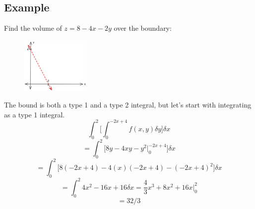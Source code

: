 \documentclass{article}
\begin{document}
\subsection{Example}
Find the volume of $z = 8 - 4x - 2y$ over the boundary: 
\begin{figure}[H]
    \centering
    \includegraphics[width=0.3\textwidth]{figures/BoundedExample.png}
\end{figure}
The bound is both a type 1 and a type 2 integral, but let's start with integrating as a type 1 integral.
$$\int_{0}^{2} \big[\int_{0}^{-2x+4} f(x, y) \delta y\big] \delta x$$
$$= \int_{0}^{2} \big[8y - 4xy - y^2\big|_0^{-2x+4}\big] \delta x$$
$$= \int_{0}^{2} \big[8(-2x+4) - 4(x)(-2x+4) - (-2x+4)^2\big] \delta x$$
$$= \int_{0}^{2} 4x^2 - 16 x + 16 \delta x = \frac{4}{3} x^3 + 8x^2 + 16x \big|_0^2$$
$$ = \boxed{32/3}$$
\end{document}
